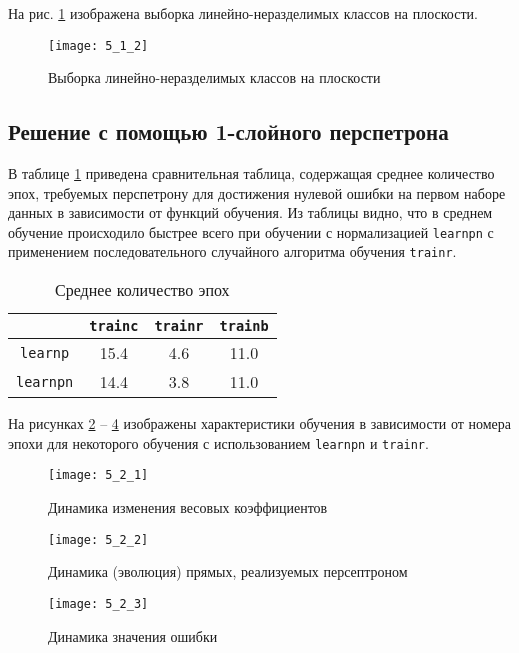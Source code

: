 На рис. \ref{fig:5_1_2} изображена выборка линейно-неразделимых классов на плоскости.

\begin{figure}[H]
\begin{center}
	\texttt{[image: 5\_1\_2]}
	\caption{Выборка линейно-неразделимых классов на плоскости}
	\label{fig:5_1_2}
\end{center}
\end{figure}

\subsection{Решение с помощью 1-слойного перспетрона}

В таблице \ref{tab:6_2_1} приведена сравнительная таблица, содержащая среднее количество эпох, требуемых перспетрону для достижения нулевой ошибки на первом наборе данных в зависимости от функций обучения. Из таблицы видно, что в среднем обучение происходило быстрее всего при обучении с нормализацией \verb+learnpn+ с применением последовательного случайного алгоритма обучения \verb+trainr+.

\begin{table}[H]
\begin{center}
	\def\tabcolsep{15pt}
	\caption{Среднее количество эпох}
	\label{tab:6_2_1}
	\begin{tabular}{|c|c|c|c|}
		\hline
		 & \verb+trainc+ & \verb+trainr+ & \verb+trainb+ \\
		\hline
		\verb+learnp+ & 15.4 & 4.6 & 11.0 \\
		\hline
		\verb+learnpn+ & 14.4 & 3.8 & 11.0 \\
		\hline
	\end{tabular}
\end{center}
\end{table} 

На рисунках \ref{fig:5_2_1} -- \ref{fig:5_2_3} изображены характеристики обучения в зависимости от номера эпохи для некоторого обучения с использованием \verb+learnpn+ и \verb+trainr+.
\begin{figure}[H]
\begin{center}
	\texttt{[image: 5\_2\_1]}
	\caption{Динамика изменения весовых коэффициентов}
	\label{fig:5_2_1}
\end{center}
\end{figure}
\begin{figure}[H]
\begin{center}
	\texttt{[image: 5\_2\_2]}
	\caption{Динамика (эволюция) прямых, реализуемых персептроном}
	\label{fig:5_2_2}
\end{center}
\end{figure}
\begin{figure}[H]
\begin{center}
	\texttt{[image: 5\_2\_3]}
	\caption{Динамика значения ошибки}
	\label{fig:5_2_3}
\end{center}
\end{figure}


